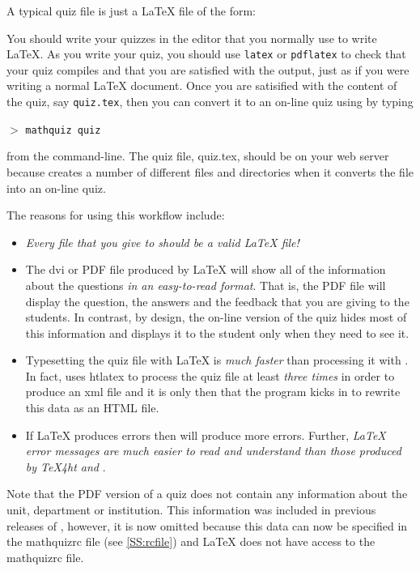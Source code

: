 \documentclass[svgnames]{article}
\newcommand\mathquizrc{\index{mathquizrc}\textsf{mathquizrc}\xspace}
\begin{document}
  A typical \MathQuiz quiz file is just a \LaTeX{} file of the form:

    

  \noindent You should write your quizzes in the editor that you
  normally use to write \LaTeX. As you write your quiz, you should use
  \Verb|latex| or \Verb|pdflatex| to check that your quiz compiles and
  that you are satisfied with the output, just as if you were writing a
  normal \LaTeX{} document.  Once you are satisified with the content of the
  quiz, say \texttt{quiz.tex}, then you can convert it to an on-line quiz using \MathQuiz
  by typing
  \begin{center}
     $>$ \texttt{mathquiz quiz}
  \end{center}
  from the command-line. The quiz file, \textsf{quiz.tex}, should be on
  your web server because \MathQuiz creates a number of different
  files and directories when it converts the file into an on-line quiz.

  The reasons for using this workflow include:
  \begin{itemize}
    \item
    \textit{Every file that you give to \MathQuiz should be a valid \LaTeX{} file!}

    \item The \textsf{dvi} or \textsf{PDF} file produced by \LaTeX{}
    will show all of the information about the questions
    \textit{in an easy-to-read format}. That is, the PDF file will
    display the question, the answers and the feedback that you are
    giving to the students. In contrast, by design, the on-line version
    of the quiz hides most of this information and displays it to the
    student only when they need to see it.

    \item Typesetting the quiz file with \LaTeX{} is \textit{much
    faster} than processing it with \MathQuiz. In fact, \MathQuiz uses
    \textsf{htlatex} to process the quiz file at least \textit{three times} in
    order to produce an \textsf{xml} file and it is only then that the
    \MathQuiz program kicks in to rewrite this data as an \textsf{HTML}
    file.

    \item If \LaTeX{} produces errors then \MathQuiz will produce more
    errors. Further, \textit{\LaTeX{} error messages are much easier to read and
    understand than those produced by \TeX4ht and \MathQuiz}.
  \end{itemize}
  Note that the PDF version of a quiz does not contain any
  information about the unit, department or institution. This
  information was included in previous releases of \MathQuiz, however, it
  is now omitted because this data can now be specified in the \mathquizrc
  file (see \autoref{SS:rcfile}) and \LaTeX{} does not have access to
  the \mathquizrc file.
\end{document}
